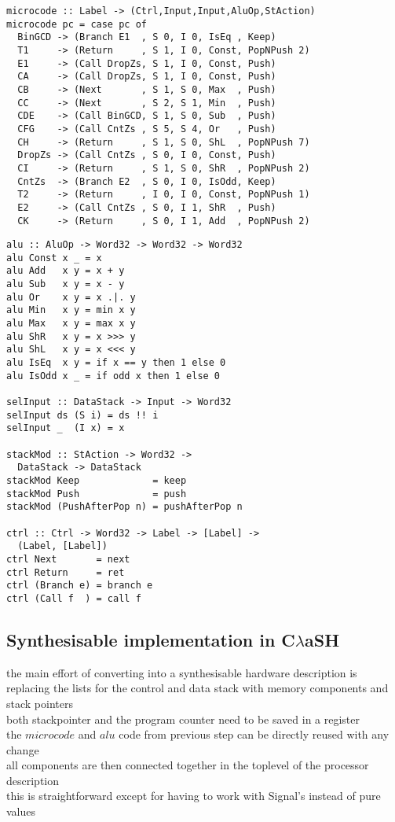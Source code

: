 \documentclass[preprint]{sigplanconf}
\def\codefamily{\sffamily\normalsize}
\def\codesmall{\sffamily\small}
\def\clash{C$\lambda$aSH\xspace}
\begin{document}
\lstset{basicstyle=\codesmall}
\begin{lstlisting}
microcode :: Label -> (Ctrl,Input,Input,AluOp,StAction)
microcode pc = case pc of
  BinGCD -> (Branch E1  , S 0, I 0, IsEq , Keep)
  T1     -> (Return     , S 1, I 0, Const, PopNPush 2)
  E1     -> (Call DropZs, S 1, I 0, Const, Push)
  CA     -> (Call DropZs, S 1, I 0, Const, Push)
  CB     -> (Next       , S 1, S 0, Max  , Push)
  CC     -> (Next       , S 2, S 1, Min  , Push)
  CDE    -> (Call BinGCD, S 1, S 0, Sub  , Push)
  CFG    -> (Call CntZs , S 5, S 4, Or   , Push)
  CH     -> (Return     , S 1, S 0, ShL  , PopNPush 7)
  DropZs -> (Call CntZs , S 0, I 0, Const, Push)
  CI     -> (Return     , S 1, S 0, ShR  , PopNPush 2)
  CntZs  -> (Branch E2  , S 0, I 0, IsOdd, Keep)
  T2     -> (Return     , I 0, I 0, Const, PopNPush 1)
  E2     -> (Call CntZs , S 0, I 1, ShR  , Push)
  CK     -> (Return     , S 0, I 1, Add  , PopNPush 2)
\end{lstlisting}
\lstset{basicstyle=\codefamily}

\begin{lstlisting}
alu :: AluOp -> Word32 -> Word32 -> Word32
alu Const x _ = x
alu Add   x y = x + y
alu Sub   x y = x - y
alu Or    x y = x .|. y
alu Min   x y = min x y
alu Max   x y = max x y
alu ShR   x y = x >>> y
alu ShL   x y = x <<< y
alu IsEq  x y = if x == y then 1 else 0
alu IsOdd x _ = if odd x then 1 else 0

selInput :: DataStack -> Input -> Word32
selInput ds (S i) = ds !! i
selInput _  (I x) = x

stackMod :: StAction -> Word32 -> 
  DataStack -> DataStack
stackMod Keep             = keep
stackMod Push             = push
stackMod (PushAfterPop n) = pushAfterPop n

ctrl :: Ctrl -> Word32 -> Label -> [Label] ->
  (Label, [Label])
ctrl Next       = next
ctrl Return     = ret
ctrl (Branch e) = branch e
ctrl (Call f  ) = call f
\end{lstlisting}

\subsection{Synthesisable implementation in \clash}
the main effort of converting into a synthesisable hardware description is replacing the lists for the control and data stack with memory components and stack pointers \\
both stackpointer and the program counter need to be saved in a register \\
the $microcode$ and $alu$ code from previous step can be directly reused with any change \\
all components are then connected together in the toplevel of the processor description \\
this is straightforward except for having to work with Signal's instead of pure values
\end{document}

